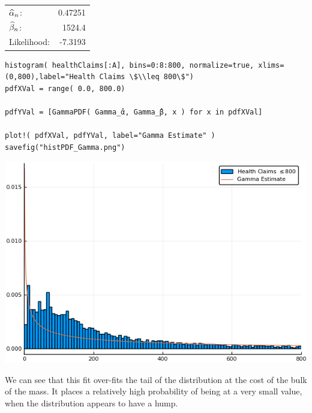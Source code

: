 \documentclass[12pt, letterpaper]{paper}
\begin{document}
\begin{center}
\begin{tabular}{lr}
\(\widehat{ \alpha }_{n}\): & 0.47251\\
\(\widehat{ \beta }_{n}\): & 1524.4\\
Likelihood: & -7.3193\\
\end{tabular}
\end{center}

\begin{verbatim}
histogram( healthClaims[:A], bins=0:8:800, normalize=true, xlims=(0,800),label="Health Claims \$\\leq 800\$")
pdfXVal = range( 0.0, 800.0)

pdfYVal = [GammaPDF( Gamma_̂α, Gamma_̂β, x ) for x in pdfXVal]

plot!( pdfXVal, pdfYVal, label="Gamma Estimate" )
savefig("histPDF_Gamma.png")
\end{verbatim}

\begin{center}
\includegraphics[width=.9\linewidth]{histPDF_Gamma.png}
\end{center}

We can see that this fit over-fits the tail of the distribution at the
cost of the bulk of the mass. It places a relatively high probability
of being at a very small value, when the distribution appears to have
a hump.
\end{document}
